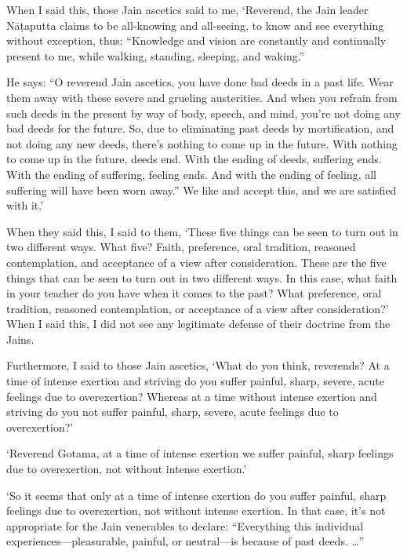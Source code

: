 \documentclass[12pt,openany]{book}%
\begin{document}
When I said this, those Jain ascetics said to me, ‘Reverend, the Jain leader \textsanskrit{Nāṭaputta} claims to be all-knowing and all-seeing, to know and see everything without exception, thus: “Knowledge and vision are constantly and continually present to me, while walking, standing, sleeping, and waking.” 

He says: “O reverend Jain ascetics, you have done bad deeds in a past life. Wear them away with these severe and grueling austerities. And when you refrain from such deeds in the present by way of body, speech, and mind, you’re not doing any bad deeds for the future. So, due to eliminating past deeds by mortification, and not doing any new deeds, there’s nothing to come up in the future. With nothing to come up in the future, deeds end. With the ending of deeds, suffering ends. With the ending of suffering, feeling ends. And with the ending of feeling, all suffering will have been worn away.” We like and accept this, and we are satisfied with it.’ 

When they said this, I said to them, ‘These five things can be seen to turn out in two different ways. What five? Faith, preference, oral tradition, reasoned contemplation, and acceptance of a view after consideration. These are the five things that can be seen to turn out in two different ways. In this case, what faith in your teacher do you have when it comes to the past? What preference, oral tradition, reasoned contemplation, or acceptance of a view after consideration?’ When I said this, I did not see any legitimate defense of their doctrine from the Jains. 

Furthermore, I said to those Jain ascetics, ‘What do you think, reverends? At a time of intense exertion and striving do you suffer painful, sharp, severe, acute feelings due to overexertion? Whereas at a time without intense exertion and striving do you not suffer painful, sharp, severe, acute feelings due to overexertion?’ 

‘Reverend Gotama, at a time of intense exertion we suffer painful, sharp feelings due to overexertion, not without intense exertion.’ 

‘So it seems that only at a time of intense exertion do you suffer painful, sharp feelings due to overexertion, not without intense exertion. In that case, it’s not appropriate for the Jain venerables to declare: “Everything this individual experiences—pleasurable, painful, or neutral—is because of past deeds. …” 
\end{document}
